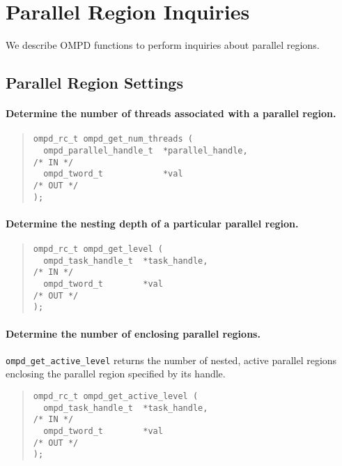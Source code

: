 \section{Parallel Region Inquiries}

We describe OMPD functions to perform inquiries about parallel regions.

\subsection{Parallel Region Settings}

\paragraph{Determine the number of threads associated with a parallel region.}

\begin{quote}
\begin{lstlisting}
ompd_rc_t ompd_get_num_threads (
  ompd_parallel_handle_t  *parallel_handle,                         /* IN */
  ompd_tword_t            *val                                     /* OUT */
);  
\end{lstlisting}
\end{quote}

\paragraph{Determine the nesting depth of a particular parallel region.}

\begin{quote}
\begin{lstlisting}
ompd_rc_t ompd_get_level (
  ompd_task_handle_t  *task_handle,                                 /* IN */
  ompd_tword_t        *val                                         /* OUT */
); 
\end{lstlisting}%
\end{quote}

\paragraph{Determine the number of enclosing  parallel regions.}
\verb|ompd_get_active_level| returns the number of nested, active
parallel regions enclosing the parallel region specified by its handle.

\begin{quote}
\begin{lstlisting}
ompd_rc_t ompd_get_active_level (
  ompd_task_handle_t  *task_handle,                                 /* IN */
  ompd_tword_t        *val                                         /* OUT */
); 
\end{lstlisting}
\end{quote}

